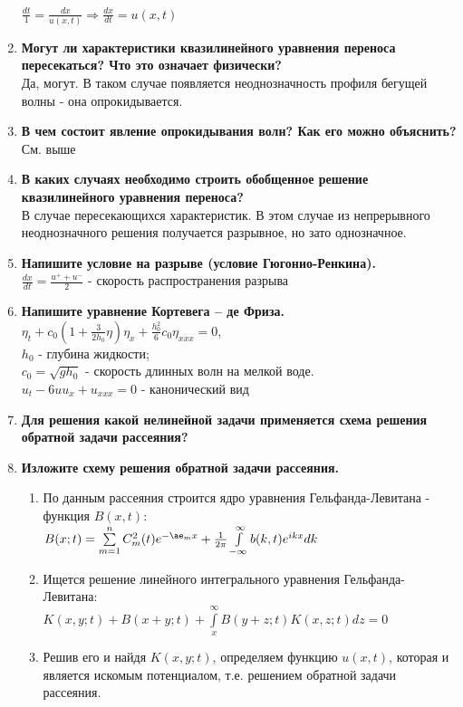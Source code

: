 \begin{enumerate}[label=\textbf{\underline{\arabic*.}}]
      $\frac{dt}{1}=\frac{dx}{u(x,t)}\Rightarrow\frac{dx}{dt}=u(x,t) $
\item \textbf{Могут ли характеристики квазилинейного уравнения переноса пересекаться? Что это означает физически?}\\
      Да, могут. В таком случае появляется неоднозначность профиля бегущей волны - она опрокидывается.
\item \textbf{В чем состоит явление опрокидывания волн? Как его можно объяснить?}\\
      См. выше
\item \textbf{В каких случаях необходимо строить обобщенное решение квазилинейного уравнения переноса?}\\
      В случае пересекающихся характеристик. В этом случае из непрерывного неоднозначного решения получается разрывное, но зато однозначное.
\item \textbf{Напишите условие на разрыве (условие Гюгонио-Ренкина).}\\
      $\frac{dx}{dt}=\frac{u^{+}+u^-}{2}$ - скорость распространения разрыва
\item \textbf{Напишите уравнение Кортевега -- де Фриза.}\\
      $\eta_t+c_0(1+\frac3{2h_0}\eta)\eta_x+\frac{h_0^2}{6}c_0\eta_{xxx}=0 $,\\
      $h_0$ - глубина жидкости;\\
      $c_0 = \sqrt{gh_0}$ - скорость длинных волн на мелкой воде.\\
      $u_t-6uu_x+u_{xxx}=0 $ - канонический вид
\item \textbf{Для решения какой нелинейной задачи применяется схема решения обратной задачи рассеяния?}\\
      \tobewritten
\item \textbf{Изложите схему решения обратной задачи рассеяния.}\\
      \begin{enumerate}
      \item По данным рассеяния строится ядро уравнения Гельфанда-Левитана - функция $B(x,t)$:\\
            $B(x;t)=\sum\limits_{m=1}^nC^2_m(t)e^{-\ae_m x}+\frac1{2\pi}\int\limits_{-\infty}^\infty b(k,t)e^{ikx}dk$
      \item Ищется решение линейного интегрального уравнения Гельфанда-Левитана:\\
            $K(x,y;t)+B(x{+}y;t)+\int\limits_x^\infty B(y{+}z;t)K(x,z;t)dz=0 $
      \item Решив его и найдя $K(x,y;t)$, определяем функцию $u(x,t) $, которая и является искомым потенциалом, т.е. решением обратной задачи рассеяния.\\

\end{enumerate}
\end{enumerate}
